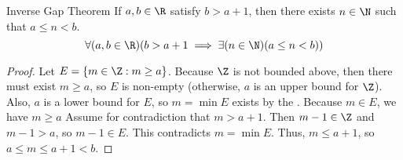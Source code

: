 \documentclass[letterpaper,12pt]{report}
\begin{document}
\iffalse
\begin{thmbox}{Archimedean Principle}{}
	For every $a,b \in \R$ where $b>0$, there exists an $n \in \N$ such that $nb>a$.
	$$\forall (a,b \in \R)(b>0) \exists (n \in \N) (nb>a)$$
	\tcblower
	\begin{proof}
		If $b>a$, then $1 \cdot b > a$, so $n=1$ satisfies the theorem.

		If $b \leq a$, let $E = \{ m \in \N : mb \leq a \}$. Note that $1 \cdot b \leq a$, so $1 \in E$. Also, if $m \in E$, then $m \leq \frac{a}{b}$. Thus $E$ is non-empty and bounded above, so $\sup E$ exists. By the approximation property for the supremum using $\epsilon = 1$, there exists an $m \in E$ such that $m > \sup E - 1$. Then $n = m + 1$ means $n$ is a natural number and $n > \sup E$. Thus $n \notin E$. Therefore, $nb>a$ as required.
	\end{proof}
\end{thmbox}

\begin{thmbox}{Corollary 3.2.2}{}
	\textbf{Corollary:} $\N$ is not bounded above.
	\tcblower
	\begin{proof}
		Suppose that $M \in \R$ is an upper bound for $\N$. By the \nameref{thm:archimedean}, there exists some $n \in \N$ such that $n = n \cdot 1 > M$. This contradicts $M$ being an upper bound for $\N$. Therefore, $\N$ has no upper bound, so it is not bounded above.
	\end{proof}
\end{thmbox}

The previous corollary also shows that $\Z$ is not bounded above. Combining this with the \nameref{thm:wop-z}, we can show that any interval of length greater than 1 contains an integer.
\fi

\begin{exbox}{Inverse Gap Theorem}{}
	If $a,b \in \R$ satisfy $b>a+1$, then there exists $n \in \N$ such that $a \leq n < b$.
	$$\forall (a,b \in \R)(b>a+1 \implies \exists (n \in \N) (a \leq n < b))$$
	\tcblower
	\begin{proof}
		Let $E = \{ m \in \Z : m \geq a \}$. Because $\Z$ is not bounded above, then there must exist $m \geq a$, so $E$ is non-empty (otherwise, $a$ is an upper bound for $\Z$). Also, $a$ is a lower bound for $E$, so $m = \min E$ exists by the . Because $m \in E$, we have $m \geq a$ Assume for contradiction that $m > a + 1$. Then $m-1 \in \Z$ and $m-1 > a$, so $m-1 \in E$. This contradicts $m = \min E$. Thus, $m \leq a + 1$, so $a \leq m \leq a + 1 < b$.
	\end{proof}
\end{exbox}
\end{document}

